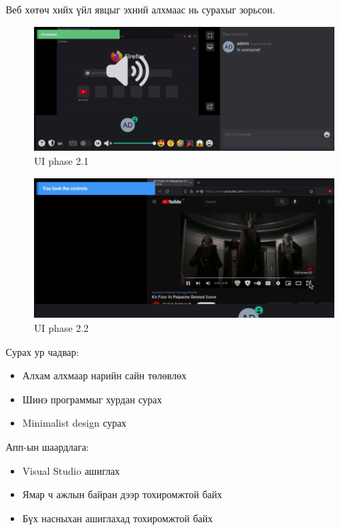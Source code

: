 Веб хөтөч хийх үйл явцыг эхний алхмаас нь сурахыг зорьсон. 
\begin{figure}
	\centering
	\includegraphics[width=15cm]{images/ui21.png}
	\caption{UI phase 2.1}
	\label{fig:form}
\end{figure}
\begin{figure}
	\centering
	\includegraphics[width=15cm]{images/ui22.png}
	\caption{UI phase 2.2}
	\label{fig:form}
\end{figure}
Сурах ур чадвар: 
\begin{itemize}
    \item Алхам алхмаар нарийн сайн төлөвлөх
    \item Шинэ программыг хурдан сурах
    \item Minimalist design сурах
\end{itemize}

Апп-ын шаардлага: 
\begin{itemize}
    \item Visual Studio ашиглах
    \item Ямар ч ажлын байран дээр тохиромжтой байх
    \item Бүх насныхан ашиглахад тохиромжтой байх
\end{itemize}
\pagebreak
